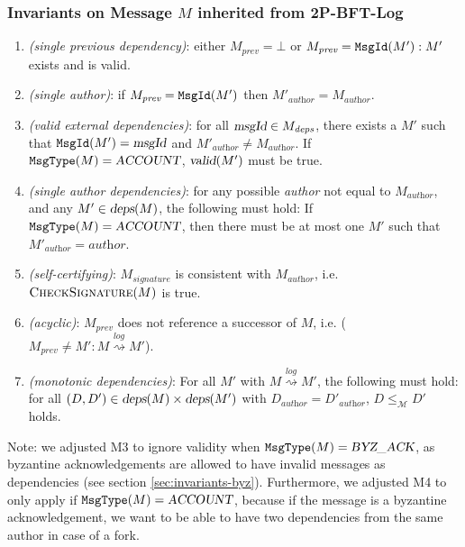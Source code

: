 \documentclass{article}
\begin{document}
\subsubsection{Invariants on Message \(M\) inherited from 2P-BFT-Log}
\begin{enumerate}
    \item [M1] \emph{(single previous dependency)}: either $M_\textit{prev} = \bot$ or $M_\textit{prev} = \texttt{MsgId}(M'): M'$ exists and is valid.
    \item [M2] \emph{(single author)}: if $M_\textit{prev} = \texttt{MsgId}(M')$ then $M'_\textit{author} = M_\textit{author}$.
    \item [M3] \emph{(valid external dependencies)}: for all $\textit{\textsl{\textsl{msgId}}} \in M_\textit{deps}$, there exists a $M'$ such that $\texttt{MsgId}(M') = \textsl{msgId}$ and $M'_\textit{author} \neq M_\textit{author}$. If $\texttt{MsgType}(M) = \textsl{ACCOUNT}$, $\textsl{valid}(M')$ must be true.
    \item [M4] \emph{(single author dependencies)}: for any possible \textit{author} not equal to $M_\textit{author}$, and any $M' \in \textsl{deps}(M)$, the following must hold: If $\texttt{MsgType}(M) = \textsl{ACCOUNT}$, then there must be at most one $M'$ such that $M'_\textit{author} = \textit{author}$.
    \item [M5] \emph{(self-certifying)}: $M_\textit{signature}$ is consistent with $M_\textit{author}$, i.e. $\textsc{CheckSignature}(M)$ is true.
    \item [M6] \emph{(acyclic)}: $M_\textit{prev}$ does not reference a successor of $M$, i.e. ($M_\textit{prev} \neq M' : M \stackrel{\textit{log}}{\rightsquigarrow} M'$).
    \item [M7] \emph{(monotonic dependencies)}: For all $M'$ with $M \stackrel{log}{\rightsquigarrow} M'$, the following must hold: for all $(D, D') \in \textsl{deps}(M) \times \textsl{deps}(M')$ with $D_\textit{author} = D'_\textit{author}$, $D \le_\mathcal M D'$ holds.
\end{enumerate}
Note: we adjusted M3 to ignore validity when $\texttt{MsgType}(M) = \textsl{BYZ\_ACK}$, as byzantine acknowledgements are allowed to have invalid messages as dependencies (see section \ref{sec:invariants-byz}). Furthermore, we adjusted M4 to only apply if $\texttt{MsgType}(M) = \textsl{ACCOUNT}$, because if the message is a byzantine acknowledgement, we want to be able to have two dependencies from the same author in case of a fork.
\end{document}
